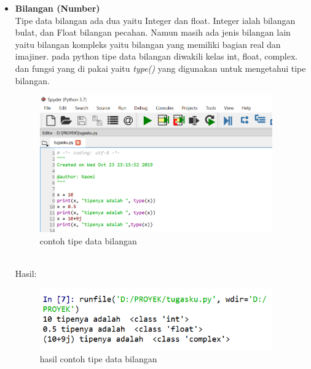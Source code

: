 \begin{enumerate}
\begin{itemize}
\item \textbf{Bilangan (Number)}\\
Tipe data bilangan ada dua yaitu Integer dan float. Integer ialah bilangan bulat, dan Float  bilangan pecahan. Namun masih ada jenis bilangan lain yaitu bilangan kompleks yaitu bilangan yang memiliki bagian real dan imajiner. pada python tipe data bilangan diwakili kelas int, float, complex. dan fungsi yang di pakai yaitu \textit{type()} yang digunakan untuk mengetahui tipe bilangan.\\
						\begin{figure}[!htbp]
						\centering
						\includegraphics[width=10cm]{gambar2/cth2.png}
						\caption{contoh tipe data bilangan}
						\end{figure}\\
 Hasil:
 						\begin{figure}[!htbp]
						\centering
						\includegraphics[width=10cm]{gambar2/hsl2.png}
						\caption{hasil contoh tipe data bilangan}
						\end{figure}\\
							

\end{itemize}
\end{enumerate}

